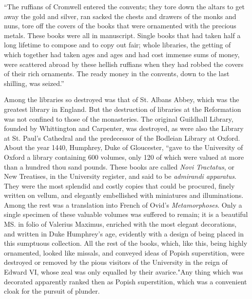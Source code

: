 \documentclass{book}
\begin{document}
“The ruffians of Cromwell entered the convents; they tore down the altars to get away the gold and silver, ran sacked the chests and drawers of the monks and nuns, tore off the covers of the books that were ornamented with the precious metals. These books were all in manuscript. Single books that had taken half a long lifetime to compose and to copy out fair; whole libraries, the getting of which together had taken ages and ages and had cost immense sums of money, were scattered abroad by these hellish ruffians when they had robbed the covers of their rich ornaments. The ready money in the convents, down to the last shilling, was seized.”\footnotemark[5]

Among the libraries so destroyed was that of St. Albans Abbey, which was the greatest library in England. But the destruction of libraries at the Reformation was not confined to those of the monasteries. The original Guildhall Library, founded by Whittington and Carpenter, was destroyed, as were also the Library at St. Paul’s Cathedral and the predecessor of the Bodleian Library at Oxford. About the year 1440, Humphrey, Duke of Gloucester, “gave to the University of Oxford a library containing 600 volumes, only 120 of which were valued at more than a hundred thou sand pounds. These books are called \emph{Novi Tractatus}, or New Treatises, in the University register, and said to be \emph{admirandi apparatus}. They were the most splendid and costly copies that could be procured, finely written on vellum, and elegantly embellished with miniatures and illuminations. Among the rest was a translation into French of Ovid’s \emph{Metamorphoses}. Only a single specimen of these valuable volumes was suffered to remain; it is a beautiful MS. in folio of Valerius Maximus, enriched with the most elegant decorations, and written in Duke Humphrey’s age, evidently with a design of being placed in this sumptuous collection. All the rest of the books, which, like this, being highly ornamented, looked like missals, and conveyed ideas of Popish superstition, were destroyed or removed by the pious visitors of the University in the reign of Edward VI, whose zeal was only equalled by their avarice."\footnotemark[6] Any thing which was decorated apparently ranked then as Popish superstition, which was a convenient cloak for the pursuit of plunder.
\end{document}
